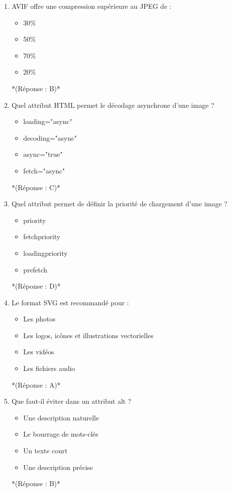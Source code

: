 \documentclass[12pt,a4paper,twoside]{report}
\begin{document}
\begin{enumerate}
\item AVIF offre une compression supérieure au JPEG de :
\begin{itemize}
\item[A)] 30\%
\item[B)] 50\%
\item[C)] 70\%
\item[D)] 20\%
\end{itemize}
*(Réponse : B)*

\item Quel attribut HTML permet le décodage asynchrone d'une image ?
\begin{itemize}
\item[A)] loading="async"
\item[B)] decoding="async"
\item[C)] async="true"
\item[D)] fetch="async"
\end{itemize}
*(Réponse : C)*

\item Quel attribut permet de définir la priorité de chargement d'une image ?
\begin{itemize}
\item[A)] priority
\item[B)] fetchpriority
\item[C)] loadingpriority
\item[D)] prefetch
\end{itemize}
*(Réponse : D)*

\item Le format SVG est recommandé pour :
\begin{itemize}
\item[A)] Les photos
\item[B)] Les logos, icônes et illustrations vectorielles
\item[C)] Les vidéos
\item[D)] Les fichiers audio
\end{itemize}
*(Réponse : A)*

\item Que faut-il éviter dans un attribut alt ?
\begin{itemize}
\item[A)] Une description naturelle
\item[B)] Le bourrage de mots-clés
\item[C)] Un texte court
\item[D)] Une description précise
\end{itemize}
*(Réponse : B)*


\end{enumerate}
\end{document}
